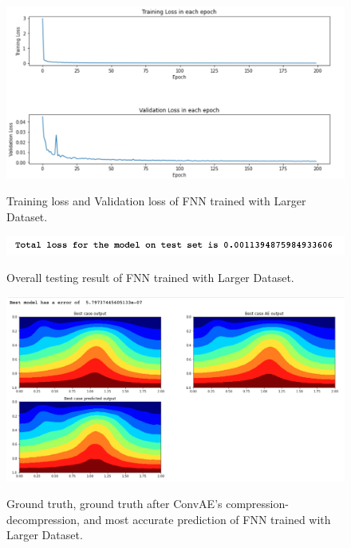 \begin{figure}[H]
    \caption{Training loss and Validation loss of FNN trained with Larger Dataset.}
    \includegraphics[scale=0.6]{figures/mantle_convection_images/larger_dataset/FNN_trainingData.png}
    \label{figure:FNN_larger_losses}
\end{figure}

\begin{figure}[H]
    \caption{Overall testing result of FNN trained with Larger Dataset.}
    \includegraphics[scale=0.8]{figures/mantle_convection_images/larger_dataset/FNN_OverallTesting.png}
    \label{figure:FNN_larger_testing}
\end{figure}

\begin{figure}[H]
    \caption{Ground truth, ground truth after ConvAE's compression-decompression, and most accurate prediction of FNN trained with Larger Dataset.}
    \includegraphics[scale=0.5]{figures/mantle_convection_images/larger_dataset/FNN_Best.png}
    \label{figure:FNN_larger_best}
\end{figure}

